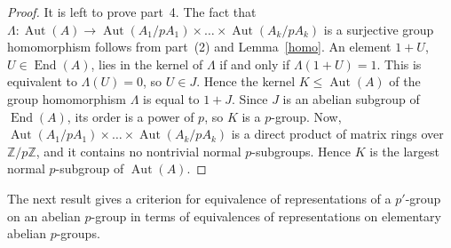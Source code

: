 \documentclass{article}
\DeclareMathOperator{\Aut}{Aut}
\DeclareMathOperator{\End}{End}
\begin{document}
\begin{proof}
	It is left to prove part~4.
	The fact that \( \Lambda : \Aut(A) \to \Aut(A_1 / pA_1) \times \dots \times \Aut(A_k / pA_k) \)
	is a surjective group homomorphism follows from part~(2) and Lemma~\ref{homo}.
	An element \( 1 + U \), \( U \in \End(A) \), lies in the kernel of \( \Lambda \) if and only if \( \Lambda(1+U) = 1 \).
	This is equivalent to \( \Lambda(U) = 0 \), so \( U \in J \). Hence the kernel \( K \leq \Aut(A) \) of the group homomorphism \( \Lambda \)
	is equal to \( 1 + J \). Since \( J \) is an abelian subgroup of \( \End(A) \), its order is a power of \( p \), so \( K \) is a \( p \)-group.
	Now, \( \Aut(A_1 / pA_1) \times \dots \times \Aut(A_k / pA_k) \) is a direct product of matrix rings over \( \mathbb{Z}/p\mathbb{Z} \),
	and it contains no nontrivial normal \( p \)-subgroups. Hence \( K \) is the largest normal \( p \)-subgroup of \( \Aut(A) \).
\end{proof}

The next result gives a criterion for equivalence of representations of a \( p' \)-group on an abelian \( p \)-group
in terms of equivalences of representations on elementary abelian \( p \)-groups.
\end{document}
